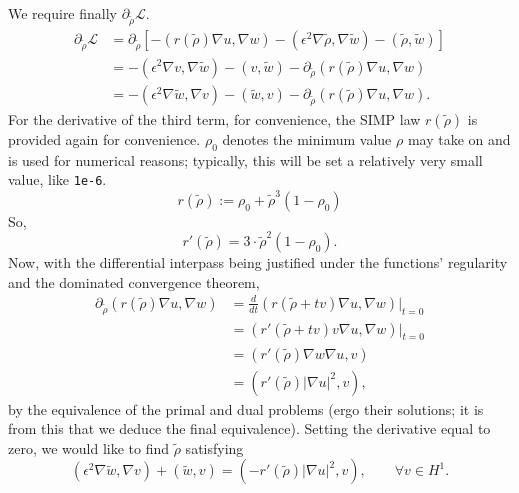 We require finally $\partial_{\tilde{\rho}} \mathcal{L}$.
\begin{align*}
    \partial_{\tilde{\rho}} \mathcal{L} &= \partial_{\tilde{\rho}} [-(r(\tilde{\rho}) \nabla u, \nabla w) - (\epsilon^2 \nabla \tilde{\rho}, \nabla \tilde{w}) - (\tilde{\rho}, \tilde{w})] \\
        &= - (\epsilon^2 \nabla v, \nabla\tilde{w}) - (v, \tilde{w}) - \partial_{\tilde{\rho}} (r(\tilde{\rho}) \nabla u, \nabla w)\\
        &= - (\epsilon^2 \nabla \tilde{w}, \nabla v) - (\tilde{w}, v) - \partial_{\tilde{\rho}} (r(\tilde{\rho}) \nabla u, \nabla w).
\end{align*}
For the derivative of the third term, for convenience, the SIMP law $r(\tilde{\rho})$ is provided again for convenience. $\rho_0$ denotes
the minimum value $\rho$ may take on and is used for numerical reasons; typically, this will be set a relatively very small value, like \texttt{1e-6}.
\begin{equation*}
    r(\tilde{\rho}) := \rho_0 + \tilde{\rho}^3 (1 - \rho_0)
\end{equation*}
So,
\begin{equation*}
    r'(\tilde{\rho}) = 3 \cdot \tilde{\rho}^2 (1 - \rho_0).
\end{equation*}
Now, with the differential interpass being justified under the functions' regularity and the dominated convergence theorem,
\begin{align*}
    \partial_{\tilde{\rho}} (r(\tilde{\rho}) \nabla u, \nabla w) &= \frac{d}{dt} (r(\tilde{\rho} + tv) \nabla u, \nabla w) \bigg|_{t=0}\\
        &= (r'(\tilde{\rho} + tv)v \nabla u, \nabla w) \bigg|_{t=0}\\
        &= (r'(\tilde{\rho})\nabla w \nabla u, v)\\
        &= (r'(\tilde{\rho}) |\nabla u|^2, v),
\end{align*}
by the equivalence of the primal and dual problems (ergo their solutions; it is from this that we deduce the final equivalence). Setting
the derivative equal to zero, we would like to find $\tilde{\rho}$ satisfying
\begin{equation*}
    (\epsilon^2 \nabla \tilde{w}, \nabla v) + (\tilde{w}, v) = (-r'(\tilde{\rho}) |\nabla u|^2, v), \qquad \forall v \in H^1.
\end{equation*}


